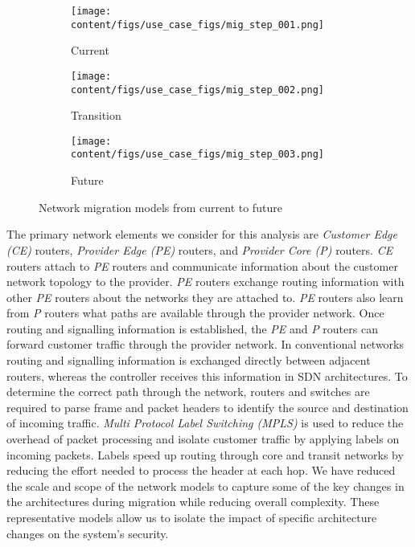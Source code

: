 

\begin{figure}[ht]
\centering
\begin{subfigure}{.33\textwidth}
\texttt{[image: content/figs/use\_case\_figs/mig\_step\_001.png]}
\caption{Current}
\label{fig:current}
\end{subfigure}%
\begin{subfigure}{.33\textwidth}
\texttt{[image: content/figs/use\_case\_figs/mig\_step\_002.png]}
\caption{Transition}
\label{fig:trans}
\end{subfigure}%
\begin{subfigure}{.33\textwidth}
\texttt{[image: content/figs/use\_case\_figs/mig\_step\_003.png]}
\caption{Future}
\label{fig:future}
\end{subfigure}%
    \caption{Network migration models from current to future}
\end{figure} 


The primary network elements we consider for this analysis are \textit{Customer Edge (CE)} routers, \textit{Provider Edge (PE)} routers, and \textit{Provider Core (P)} routers. \textit{CE} routers attach to \textit{PE} routers and communicate information about the customer network  topology to the provider. \textit{PE} routers exchange routing information with other \textit{PE} routers about the networks they are attached to. \textit{PE} routers also learn from \textit{P} routers what paths are available through the provider network.  Once routing and signalling information is established, the \textit{PE} and \textit{P} routers can forward customer traffic through the provider network. In conventional networks routing and signalling information is exchanged directly between adjacent routers, whereas the controller receives this information in SDN architectures. To determine the correct path through the network, routers and switches are required to parse frame and packet headers to identify the source and destination of incoming traffic. \textit{Multi Protocol Label Switching (MPLS)}\cite{Awduche_Agogbua_1999} is used to reduce the overhead of packet processing and isolate customer traffic by applying labels on incoming packets. Labels speed up routing through core and transit networks by reducing the effort needed to process the header at each hop. We have reduced the scale and scope of the network models to capture some of the key changes in the architectures during migration while reducing overall complexity. These representative models allow us to isolate the impact of specific architecture changes on the system’s security.  %

